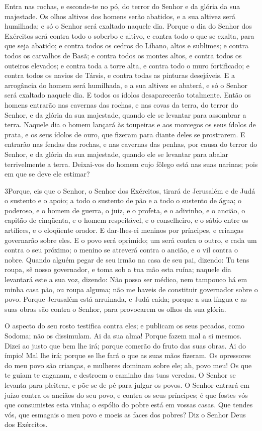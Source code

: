 Entra nas rochas, e esconde-te no pó, do terror do Senhor e da
glória da sua majestade. Os olhos altivos dos homens serão
abatidos, e a sua altivez será humilhada; e só o Senhor será
exaltado naquele dia. Porque o dia do Senhor dos Exércitos
será contra todo o soberbo e altivo, e contra todo o que se exalta,
para que seja abatido; e contra todos os cedros do Líbano,
altos e sublimes; e contra todos os carvalhos de Basã; e
contra todos os montes altos, e contra todos os outeiros elevados;
e contra toda a torre alta, e contra todo o muro fortificado;
e contra todos os navios de Társis, e contra todas as
pinturas desejáveis. E a arrogância do homem será humilhada,
e a sua altivez se abaterá, e só o Senhor será exaltado naquele dia.
E todos os ídolos desaparecerão totalmente. Então os
homens entrarão nas cavernas das rochas, e nas covas da terra, do
terror do Senhor, e da glória da sua majestade, quando ele se
levantar para assombrar a terra. Naquele dia o homem lançará
às toupeiras e aos morcegos os seus ídolos de prata, e os seus
ídolos de ouro, que fizeram para diante deles se prostrarem.
E entrarão nas fendas das rochas, e nas cavernas das penhas,
por causa do terror do Senhor, e da glória da sua majestade, quando
ele se levantar para abalar terrivelmente a terra. Deixai-vos
do homem cujo fôlego está nas suas narinas; pois em que se deve ele
estimar?

\medskip

\lettrine{3}{}Porque, eis que o Senhor, o Senhor dos Exércitos,
tirará de Jerusalém e de Judá o sustento e o apoio; a todo o
sustento de pão e a todo o sustento de água; o poderoso, e o
homem de guerra, o juiz, e o profeta, e o adivinho, e o ancião,
o capitão de cinqüenta, e o homem respeitável, e o conselheiro,
e o sábio entre os artífices, e o eloqüente orador. E
dar-lhes-ei meninos por príncipes, e crianças governarão sobre eles.
E o povo será oprimido; um será contra o outro, e cada um contra
o seu próximo; o menino se atreverá contra o ancião, e o vil contra
o nobre. Quando alguém pegar de seu irmão na casa de seu pai,
dizendo: Tu tens roupa, sê nosso governador, e toma sob a tua mão
esta ruína; naquele dia levantará este a sua voz, dizendo: Não
posso ser médico, nem tampouco há em minha casa pão, ou roupa
alguma; não me haveis de constituir governador sobre o povo.
Porque Jerusalém está arruinada, e Judá caída; porque a sua
língua e as suas obras são contra o Senhor, para provocarem os olhos
da sua glória.

O aspecto do seu rosto testifica contra eles; e publicam os seus
pecados, como Sodoma; não os dissimulam. Ai da sua alma! Porque
fazem mal a si mesmos. Dizei ao justo que bem lhe irá; porque
comerão do fruto das suas obras. Ai do ímpio! Mal lhe irá;
porque se lhe fará o que as suas mãos fizeram. Os opressores
do meu povo são crianças, e mulheres dominam sobre ele; ah, povo
meu! Os que te guiam te enganam, e destroem o caminho das tuas
veredas. O Senhor se levanta para pleitear, e põe-se de pé
para julgar os povos. O Senhor entrará em juízo contra os
anciãos do seu povo, e contra os seus príncipes; é que fostes vós
que consumistes esta vinha; o espólio do pobre está em vossas casas.
Que tendes vós, que esmagais o meu povo e moeis as faces dos
pobres? Diz o Senhor Deus dos Exércitos.

